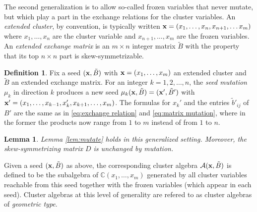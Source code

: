 \documentclass{amsart}
\newtheorem{lemma}[theorem]{Lemma}
\theoremstyle{definition}
\newtheorem{definition}[theorem]{Definition}
\theoremstyle{remark}
\numberwithin{equation}{section}
\newcommand{\cA}{{\mathcal{A}}}
\newcommand{\x}{{\bf x}}
\newcommand{\CC}{{\mathbb{C}}}
\begin{document}
	The second generalization is to allow so-called frozen variables that never mutate, but which play a part in the exchange relations for the cluster variables. An \emph{extended cluster}, by convention, is typically written $\x = (x_1,\ldots, x_n, x_{n+1},\ldots x_m)$ where $x_1,\ldots, x_n$ are the cluster variable and $x_{n+1},\ldots, x_m$ are the frozen variables.  An \emph{extended exchange matrix} is an $m \times n$ integer matrix $\tilde{B}$ with the property that its top $n \times n$ part is skew-symmetrizable.
	
	\begin{definition}
	Fix a seed $(\x, \tilde B)$ with $\x=(x_1,\ldots, x_m)$ an extended cluster and $\tilde{B}$ an extended exchange matrix.  For an integer $k = 1,2,\ldots, n$, the \emph{seed mutation} $\mu_k$ in direction $k$ produces a new seed $\mu_k(\x,\tilde{B}) = (\x',\tilde{B}')$ with $\x' = (x_1,\ldots, x_{k-1}, x_k', x_{k+1},\ldots, x_m)$.  The formulas for $x_k'$ and the entries $\tilde{b}'_{ij}$ of $B'$ are the same as in \eqref{eq:exchange relation} and \eqref{eq:matrix mutation}, where in the former the products now range from $1$ to $m$ instead of from $1$ to $n$.
	\end{definition}
	
	\begin{lemma}
	Lemma \ref{lem:mutate} holds in this generalized setting.  Moreover, the skew-symmetrizing matrix $D$ is unchanged by mutation.
	\end{lemma}
	
	Given a seed $(\x, \tilde{B})$ as above, the corresponding cluster algebra $\cA(\x, \tilde{B})$ is defined to be the subalgebra of $\CC(x_1,\ldots, x_m)$ generated by all cluster variables reachable from this seed together with the frozen variables (which appear in each seed).  Cluster algebras at this level of generality are refered to as cluster algebras of \emph{geometric type}.
	
\end{document}
